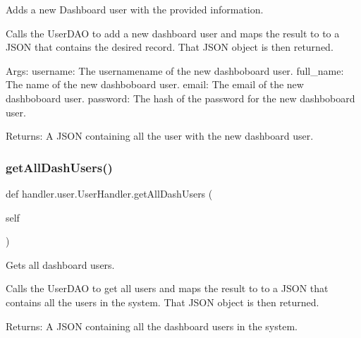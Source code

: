 \begin{DoxyVerb}Adds a new Dashboard user with the provided information.

Calls the UserDAO to add a new dashboard user and maps the result to
to a JSON that contains the desired record. That JSON object 
is then returned.

Args:
    username: The usernamename of the new dashboboard user.
    full_name: The name of the new dashboboard user.
    email: The email of the new dashboboard user.
    password: The hash of the password for the new dashboboard user.

Returns:
    A JSON containing all the user with the new dashboard user.
\end{DoxyVerb}
 \mbox{\label{classhandler_1_1user_1_1_user_handler_a7fcf1c2f61bb89c83536a0066d089de1}} 
\subsubsection{\texorpdfstring{get\+All\+Dash\+Users()}{getAllDashUsers()}}
{\footnotesize\ttfamily def handler.\+user.\+User\+Handler.\+get\+All\+Dash\+Users (\begin{DoxyParamCaption}\item[{}]{self }\end{DoxyParamCaption})}

\begin{DoxyVerb}Gets all dashboard users.

Calls the UserDAO to get all users and maps the result to
to a JSON that contains all the users in the system. That
JSON object is then returned.

Returns:
    A JSON containing all the dashboard users in the system. 
\end{DoxyVerb}
 \mbox{\label{classhandler_1_1user_1_1_user_handler_ae8de510893a8c86cc173b55739143368}} 

